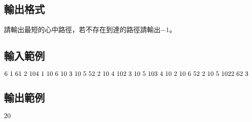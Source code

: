 \documentclass{article}
\begin{document}
\begin{CJK*}{UTF8}{bsmi}
\subsection*{輸出格式}
請輸出最短的心中路徑，若不存在到達的路徑請輸出$-1$。

\subsection*{輸入範例}
$6\ 1\ 6\\1\ 2\ 10\\4\ 1\ 10\ 6\ 10\ 3\ 10\ 5\ 5\\2\ 2\ 10\ 4\ 10\\2\ 3\ 10\ 5\ 10\\3\ 4\ 10\ 2\ 10\ 6\ 5\\2\ 2\ 10\ 5\ 10\\2\\2\ 6\\2\ 3$

\subsection*{輸出範例}
$20$

\end{CJK*}
\end{document}
